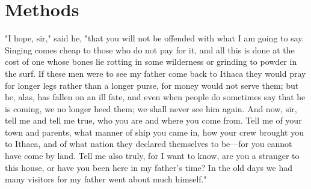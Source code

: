 \section{Methods}

"I hope, sir," said he, "that you will not be offended with what I am going to
say. Singing comes cheap to those who do not pay for it, and all this is done
at the cost of one whose bones lie rotting in some wilderness or grinding to
powder in the surf. If these men were to see my father come back to Ithaca
they would pray for longer legs rather than a longer purse, for money would
not serve them; but he, alas, has fallen on an ill fate, and even when people
do sometimes say that he is coming, we no longer heed them; we shall never see
him again. And now, sir, tell me and tell me true, who you are and where you
come from. Tell me of your town and parents, what manner of ship you came in,
how your crew brought you to Ithaca, and of what nation they declared
themselves to be—for you cannot have come by land. Tell me also truly, for I
want to know, are you a stranger to this house, or have you been here in my
father's time? In the old days we had many visitors for my father went about
much himself."
